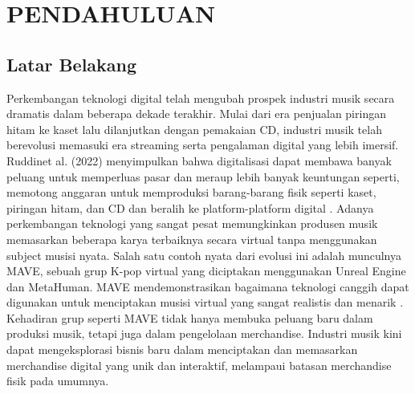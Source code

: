 \chapter{PENDAHULUAN}

\section{Latar Belakang}

Perkembangan teknologi digital telah mengubah prospek industri musik secara dramatis dalam beberapa dekade terakhir. 
Mulai dari era penjualan piringan hitam ke kaset lalu dilanjutkan dengan pemakaian CD, industri musik telah berevolusi 
memasuki era streaming serta pengalaman digital yang lebih imersif. Ruddinet al. (2022) menyimpulkan bahwa digitalisasi 
dapat membawa banyak peluang untuk memperluas pasar dan meraup lebih banyak keuntungan seperti, memotong anggaran untuk 
memproduksi barang-barang fisik seperti kaset, piringan hitam, dan CD dan beralih ke platform-platform digital \parencite{Ruddin2022}. Adanya
perkembangan teknologi yang sangat pesat memungkinkan produsen musik memasarkan beberapa karya terbaiknya secara virtual
tanpa menggunakan subject musisi nyata. Salah satu contoh nyata dari evolusi ini adalah munculnya MAVE, sebuah grup K-pop
virtual yang diciptakan menggunakan Unreal Engine dan MetaHuman. MAVE mendemonstrasikan bagaimana teknologi canggih dapat
digunakan untuk menciptakan musisi virtual yang sangat realistis dan menarik \parencite{EpicGames2023}. Kehadiran grup seperti MAVE tidak hanya
membuka peluang baru dalam produksi musik, tetapi juga dalam pengelolaan merchandise. Industri musik kini dapat 
mengeksplorasi bisnis baru dalam menciptakan dan memasarkan merchandise digital yang unik dan interaktif, melampaui 
batasan merchandise fisik pada umumnya.
\\

